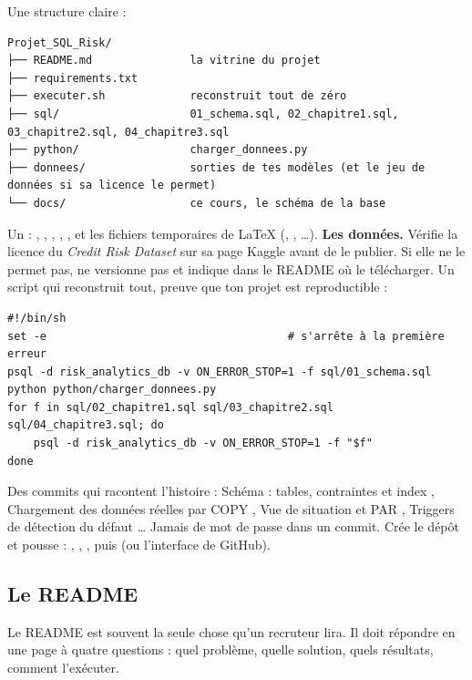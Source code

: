 \begin{itemize}[label={}, leftmargin=1.2em]
\tache Une structure claire :
\begin{lstlisting}[style=sortie]
Projet_SQL_Risk/
├── README.md               la vitrine du projet
├── requirements.txt
├── executer.sh             reconstruit tout de zéro
├── sql/                    01_schema.sql, 02_chapitre1.sql, 03_chapitre2.sql, 04_chapitre3.sql
├── python/                 charger_donnees.py
├── donnees/                sorties de tes modèles (et le jeu de données si sa licence le permet)
└── docs/                   ce cours, le schéma de la base
\end{lstlisting}
\tache Un  : , , , ,
, et les fichiers temporaires de LaTeX (, , \dots).
\tache \textbf{Les données.} Vérifie la licence du \emph{Credit Risk Dataset} sur sa page Kaggle avant
de le publier. Si elle ne le permet pas, ne versionne pas  et indique dans
le README où le télécharger.
\tache Un script  qui reconstruit tout, preuve que ton projet est reproductible :
\begin{lstlisting}[style=shell]
#!/bin/sh
set -e                                     # s'arrête à la première erreur
psql -d risk_analytics_db -v ON_ERROR_STOP=1 -f sql/01_schema.sql
python python/charger_donnees.py
for f in sql/02_chapitre1.sql sql/03_chapitre2.sql sql/04_chapitre3.sql; do
    psql -d risk_analytics_db -v ON_ERROR_STOP=1 -f "$f"
done
\end{lstlisting}
\tache Des commits qui racontent l'histoire : \og Schéma : tables, contraintes et index \fg{},
\og Chargement des données réelles par COPY \fg{}, \og Vue de situation et PAR \fg{}, \og Triggers de
détection du défaut \fg{}\dots{} Jamais de mot de passe dans un commit.
\tache Crée le dépôt et pousse : , , , puis
 (ou l'interface de GitHub).
\end{itemize}

\subsection{Le README}

Le README est souvent la seule chose qu'un recruteur lira. Il doit répondre en une page à quatre
questions : quel problème, quelle solution, quels résultats, comment l'exécuter.

